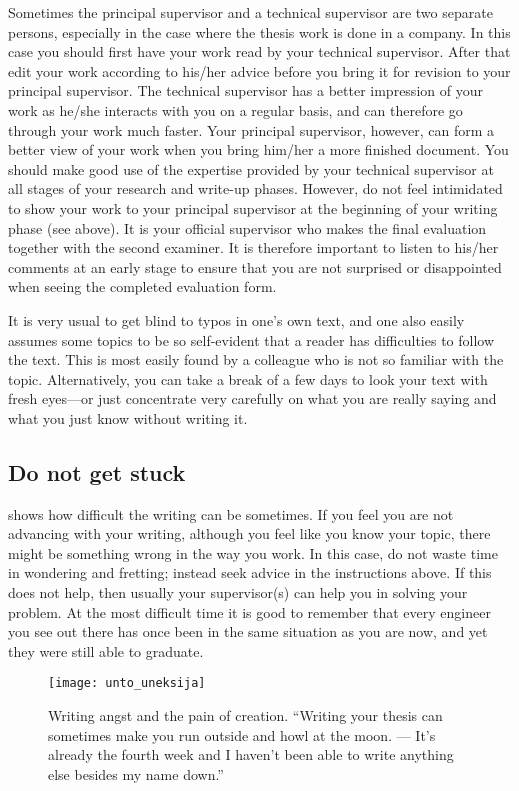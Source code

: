 Sometimes the principal supervisor and a technical supervisor are two
separate persons, especially in the case where the thesis work is
done in a company. In this case you should first have your work read
by your technical supervisor. After that edit your work according to
his/her advice before you bring it for revision to your principal
supervisor. The technical supervisor has a better impression of your
work as he/she interacts with you on a regular basis, and can
therefore go through your work much faster. Your principal
supervisor, however, can form a better view of your work when you
bring him/her a more finished document. You should make good use of
the expertise provided by your technical supervisor at all stages of
your research and write-up phases. However, do not feel intimidated
to show your work to your principal supervisor at the beginning of
your writing phase (see  above). It is your
official supervisor who makes the final evaluation together with the
second examiner. It is therefore important to listen to his/her
comments at an early stage to ensure that you are not surprised or
disappointed when seeing the completed evaluation form.

It is very usual to get blind to typos in one’s own text, and one
also easily assumes some topics to be so self-evident that a reader
has difficulties to follow the text. This is most easily found by a
colleague who is not so familiar with the topic. Alternatively, you
can take a break of a few days to look your text with fresh eyes---or
just concentrate very carefully on what you are really saying and
what you just know without writing it.

\subsection{Do not get stuck}

 shows how difficult the writing can be
sometimes. If you feel you are not advancing with your writing,
although you feel like you know your topic, there might be something
wrong in the way you work. In this case, do not waste time in
wondering and fretting; instead seek advice in the instructions
above. If this does not help, then usually your supervisor(s) can
help you in solving your problem. At the most difficult time it is
good to remember that every engineer you see out there has once been
in the same situation as you are now, and yet they were still able to graduate.

\begin{figure}[ht]
\begin{center}
  \texttt{[image: unto\_uneksija]}
\end{center}
\caption{Writing angst and the pain of creation. “Writing your thesis
  can sometimes
  make you run outside and howl at the moon. --- It’s already the
  fourth week and I
haven’t been able to write anything else besides my name down.”}
\label{fig:unto_uneksija}
\end{figure}


